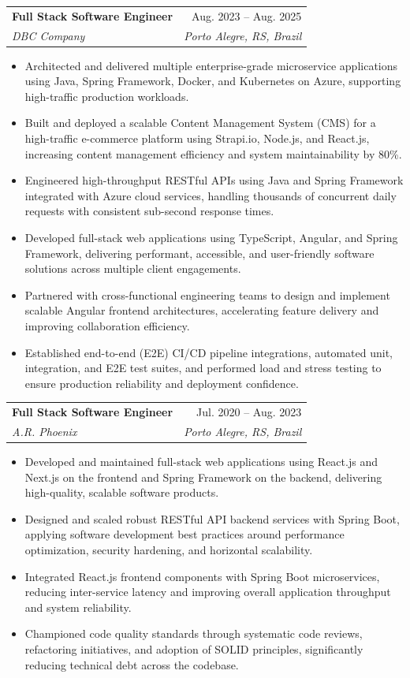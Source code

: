 \documentclass[letterpaper,11pt]{article}
\makeatletter
\newcommand{\resumeItem}[1]{
  \item\small{{#1 \vspace{-2pt}}}
}
\newcommand{\resumeSubheading}[4]{
  \vspace{-2pt}\item
    \begin{tabular*}{0.97\textwidth}[t]{l@{\extracolsep{\fill}}r}
      \textbf{#1} & #2 \\
      \textit{\small#3} & \textit{\small #4} \\
    \end{tabular*}\vspace{-7pt}
}
\newcommand{\resumeItemListStart}{\begin{itemize}}
\newcommand{\resumeItemListEnd}{\end{itemize}\vspace{-5pt}}
\makeatother
\begin{document}
    \resumeSubheading
      {Full Stack Software Engineer}{Aug. 2023 -- Aug. 2025}
      {DBC Company}{Porto Alegre, RS, Brazil}
      \resumeItemListStart
        \resumeItem{Architected and delivered multiple enterprise-grade microservice applications using Java, Spring Framework, Docker, and Kubernetes on Azure, supporting high-traffic production workloads.}
        \resumeItem{Built and deployed a scalable Content Management System (CMS) for a high-traffic e-commerce platform using Strapi.io, Node.js, and React.js, increasing content management efficiency and system maintainability by 80\%.}
        \resumeItem{Engineered high-throughput RESTful APIs using Java and Spring Framework integrated with Azure cloud services, handling thousands of concurrent daily requests with consistent sub-second response times.}
        \resumeItem{Developed full-stack web applications using TypeScript, Angular, and Spring Framework, delivering performant, accessible, and user-friendly software solutions across multiple client engagements.}
        \resumeItem{Partnered with cross-functional engineering teams to design and implement scalable Angular frontend architectures, accelerating feature delivery and improving collaboration efficiency.}
        \resumeItem{Established end-to-end (E2E) CI/CD pipeline integrations, automated unit, integration, and E2E test suites, and performed load and stress testing to ensure production reliability and deployment confidence.}
      \resumeItemListEnd

    \resumeSubheading
      {Full Stack Software Engineer}{Jul. 2020 -- Aug. 2023}
      {A.R. Phoenix}{Porto Alegre, RS, Brazil}
      \resumeItemListStart
        \resumeItem{Developed and maintained full-stack web applications using React.js and Next.js on the frontend and Spring Framework on the backend, delivering high-quality, scalable software products.}
        \resumeItem{Designed and scaled robust RESTful API backend services with Spring Boot, applying software development best practices around performance optimization, security hardening, and horizontal scalability.}
        \resumeItem{Integrated React.js frontend components with Spring Boot microservices, reducing inter-service latency and improving overall application throughput and system reliability.}
        \resumeItem{Championed code quality standards through systematic code reviews, refactoring initiatives, and adoption of SOLID principles, significantly reducing technical debt across the codebase.}
      \resumeItemListEnd
\end{document}
